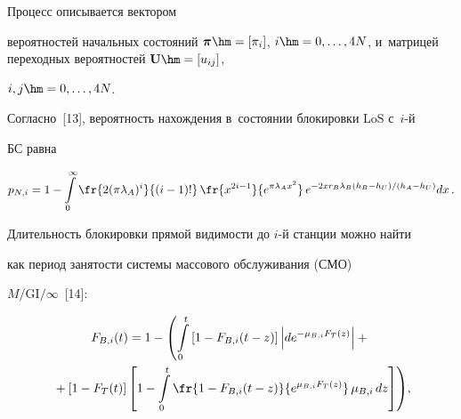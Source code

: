  Процесс описывается вектором 


вероятностей начальных со\-сто\-яний $\boldsymbol{\pi}\hm= [\pi_i]$, $i\hm= 


0,\ldots , 4N$, и~мат\-ри\-цей переходных вероятностей $\mathbf{U}\hm= [u_{ij}]$, 


$i,j\hm= 0,\ldots , 4N$.


  


  Согласно~[13], вероятность на\-хож\-де\-ния в~со\-сто\-янии блокировки LoS с~$i$-й 


БС равна


  \begin{equation*}


  p_{N,i}=1-\int\limits_0^\infty \fr{2(\pi\lambda_A)^i}{(i-1)!}\, \fr{x^{2i-


1}}{e^{\pi\lambda_A x^2}}\,e^{-2 x r_B \lambda_B (h_B-h_U)/(h_A-h_U) } dx\,.




  \end{equation*}


  


  Длительность блокировки прямой видимости до $i$-й станции мож\-но найти 


как период за\-ня\-тости сис\-те\-мы массового обслуживания (СМО) 


$M/\mathrm{GI}/\infty$~[14]:





\vspace*{-6pt}





\noindent


  \begin{multline*}


  F_{B,i}(t)= 1-\left(  \int\limits_0^t\left[ 1-F_{B,i}(t-z)\right]\left\vert 


  de^{-\mu_{B,i}F_T(z)}\right\vert +{}\right.\\


\left.{}+ \left[ 1-F_T(t)\right] \left[ 1-\int\limits_0^t \fr{1- F_{B,i}(t-z)} 


{e^{\mu_{B,i}F_T(z)}}\, \mu_{B,i}\,dz\right]\right)\!,


  \end{multline*}


  


